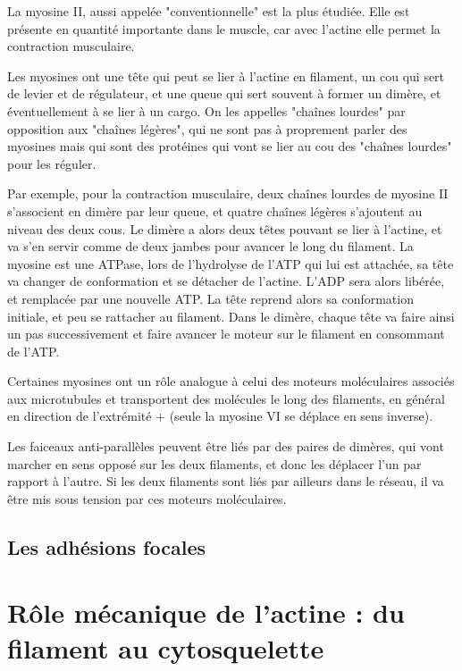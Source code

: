 \documentclass{report}
\begin{document}
La myosine II, aussi appelée "conventionnelle" est la plus étudiée. Elle est présente en quantité importante dans le muscle, car avec l'actine elle permet la contraction musculaire. 

Les myosines ont une tête qui peut se lier à l'actine en filament, un cou  qui sert de levier et de régulateur, et une queue qui sert souvent à former un dimère, et éventuellement à se lier à un cargo. On les appelles "chaînes lourdes" par opposition aux "chaînes légères", qui ne sont pas à proprement parler des myosines mais qui sont des protéines qui vont se lier au cou des "chaînes lourdes" pour les réguler. 

Par exemple, pour la contraction musculaire, deux chaînes lourdes de myosine II s'associent en dimère par leur queue, et quatre chaînes légères s'ajoutent au niveau des deux cous. Le dimère a alors deux têtes pouvant se lier à l'actine, et va s'en servir comme de deux jambes pour avancer le long du filament. 
La myosine est une ATPase, lors de l'hydrolyse de l'ATP qui lui est attachée, sa tête va changer de conformation et se détacher de l'actine. L'ADP sera alors libérée, et remplacée par une nouvelle ATP.  La tête reprend alors sa conformation initiale, et peu se rattacher au filament. Dans le dimère, chaque tête va faire ainsi un pas successivement et faire avancer le moteur sur le filament en consommant de l'ATP. 



Certaines myosines ont un rôle analogue à celui des moteurs moléculaires associés aux microtubules et transportent des molécules le long des filaments, en général en direction de l'extrémité + (seule la myosine VI se déplace en sens inverse). 


Les faiceaux anti-parallèles peuvent être liés par des paires de dimères, qui vont marcher en sens opposé sur les deux filaments, et donc les déplacer l'un par rapport à l'autre. Si les deux filaments sont liés par ailleurs dans le réseau, il va être mis sous tension par ces moteurs moléculaires.

\subsection{Les adhésions focales}


\section{Rôle mécanique de l'actine : du filament au cytosquelette}
\end{document}
